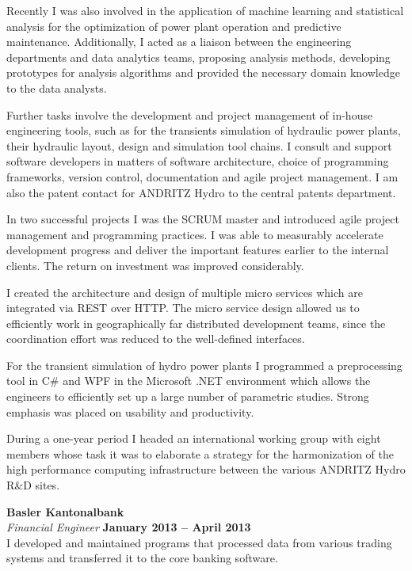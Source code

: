 \documentclass[line,11pt,a4paper]{resume}
\begin{document}
\begin{resume}
Recently I was also involved in the application of machine learning
and statistical analysis for the optimization of power plant operation and
predictive maintenance. Additionally, I acted as a liaison between the engineering
departments and data analytics teams, proposing analysis methods, developing
prototypes for analysis algorithms and provided the necessary domain knowledge
to the data analysts.

Further tasks involve the development and project management of in-house
engineering tools, such as for the transients simulation of hydraulic power
plants, their hydraulic layout, design and simulation tool chains. I consult
and support software developers in matters of software architecture, choice
of programming frameworks, version control, documentation and agile project
management. I am also the patent contact for ANDRITZ Hydro to the central
patents department.

In two successful projects I was the SCRUM master and introduced agile
project management and programming practices. I was able to measurably
accelerate development progress and deliver the important features earlier
to the internal clients. The return on investment was improved considerably.

I created the architecture and design of multiple micro services which
are integrated via REST over HTTP. The micro service design allowed us to
efficiently work in geographically far distributed development teams, since the
coordination effort was reduced to the well-defined interfaces.

For the transient simulation of hydro power plants I programmed a preprocessing
tool in C\# and WPF in the Microsoft .NET environment which allows the
engineers to efficiently set up a large number of parametric studies. Strong
emphasis was placed on usability and productivity.

During a one-year period I headed an international working group with eight
members whose task it was to elaborate a strategy for the harmonization of the
high performance computing infrastructure between the various ANDRITZ Hydro
R\&D sites.

\textbf{Basler Kantonalbank} \vspace{2mm}\\\vspace{1mm}%
\textsl{Financial Engineer} \hfill \textbf{January 2013 -- April 2013}\\
I developed and maintained programs that processed data from various trading
systems and transferred it to the core banking software.


\end{resume}
\end{document}
